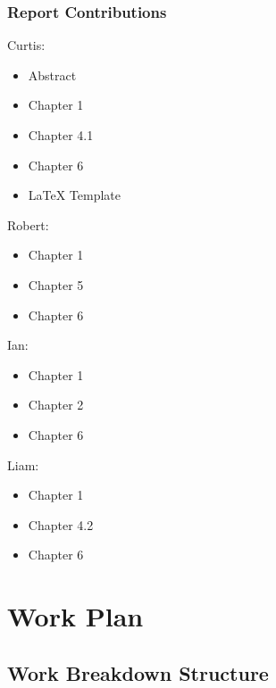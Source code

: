 \documentclass[titlepage,draft]{article}
\begin{document}
\subsubsection{Report Contributions}
Curtis:
\begin{itemize}
	\item Abstract
	\item Chapter 1
	\item Chapter 4.1
	\item Chapter 6
	\item LaTeX Template
\end{itemize}

Robert:
\begin{itemize}
	\item Chapter 1
	\item Chapter 5
	\item Chapter 6
\end{itemize}

Ian:
\begin{itemize}
	\item Chapter 1
	\item Chapter 2
	\item Chapter 6
\end{itemize}

Liam:
\begin{itemize}
	\item Chapter 1
	\item Chapter 4.2
	\item Chapter 6
\end{itemize}

\section{Work Plan}

\subsection{Work Breakdown Structure}
\end{document}
